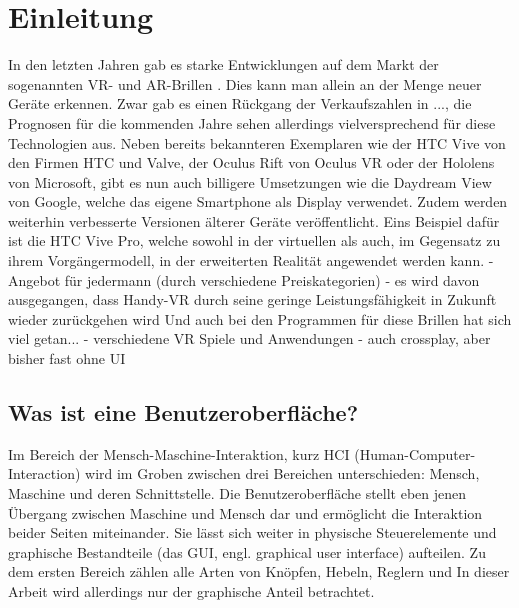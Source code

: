 
\chapter{Einleitung}\label{chapter:introduction}

	
	
	
	In den letzten Jahren gab es starke Entwicklungen auf dem Markt der sogenannten VR- und AR-Brillen . Dies kann man allein an der Menge neuer Geräte erkennen.
	Zwar gab es einen Rückgang der Verkaufszahlen in ..., die Prognosen für die kommenden Jahre sehen allerdings vielversprechend für diese Technologien aus.
	Neben bereits bekannteren Exemplaren wie der HTC Vive von den Firmen HTC und Valve, der Oculus Rift von Oculus VR oder der Hololens von Microsoft, gibt es nun auch billigere Umsetzungen wie die Daydream View von Google, welche das eigene Smartphone als Display verwendet. Zudem werden weiterhin verbesserte Versionen älterer Geräte veröffentlicht. Eins Beispiel dafür ist die HTC Vive Pro, welche sowohl in der virtuellen als auch, im Gegensatz zu ihrem Vorgängermodell, in der erweiterten Realität angewendet werden kann.
	- Angebot für jedermann (durch verschiedene Preiskategorien)
	- es wird davon ausgegangen, dass Handy-VR durch seine geringe Leistungsfähigkeit in Zukunft wieder zurückgehen wird
	Und auch bei den Programmen für diese Brillen hat sich viel getan...
	- verschiedene VR Spiele und Anwendungen
	- auch crossplay, aber bisher fast ohne UI

	\section{Was ist eine Benutzeroberfläche?}
		Im Bereich der Mensch-Maschine-Interaktion, kurz HCI (Human-Computer-Interaction) wird im Groben zwischen drei Bereichen unterschieden: Mensch, Maschine und deren Schnittstelle.\linebreak
		Die Benutzeroberfläche  stellt eben jenen Übergang zwischen Maschine und Mensch dar und ermöglicht die Interaktion beider Seiten miteinander.
		Sie lässt sich weiter in physische Steuerelemente und graphische Bestandteile (das GUI, engl. graphical user interface) aufteilen. Zu dem ersten Bereich zählen alle Arten von Knöpfen, Hebeln, Reglern und 
		In dieser Arbeit wird allerdings nur der graphische Anteil betrachtet.
		
